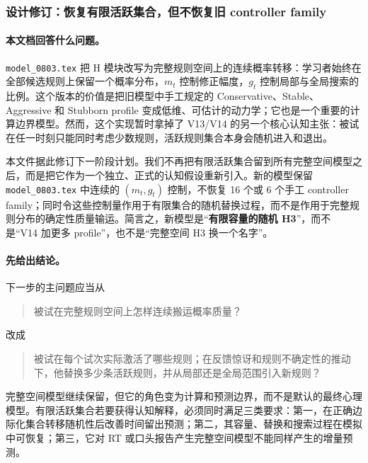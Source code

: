
\subsubsection{设计修订：恢复有限活跃集合，但不恢复旧 controller family}

\paragraph{本文档回答什么问题。}
\texttt{model\_0803.tex} 把 H 模块改写为完整规则空间上的连续概率转移：学习者始终在全部候选规则上保留一个概率分布，$m_t$ 控制修正幅度，$g_t$ 控制局部与全局搜索的比例。这个版本的价值是把旧模型中手工规定的 Conservative、Stable、Aggressive 和 Stubborn profile 变成低维、可估计的动力学；它也是一个重要的计算边界模型。然而，这个实现暂时拿掉了 V13/V14 的另一个核心认知主张：被试在任一时刻只能同时考虑少数规则，活跃规则集合本身会随机进入和退出。

本文件据此修订下一阶段计划。我们不再把有限活跃集合留到所有完整空间模型之后，而是把它作为一个独立、正式的认知假设重新引入。新的模型保留 \texttt{model\_0803.tex} 中连续的 $(m_t,g_t)$ 控制，不恢复 16 个或 6 个手工 controller family；同时令这些控制量作用于有限集合的随机替换过程，而不是作用于完整规则分布的确定性质量输运。简言之，新模型是“\textbf{有限容量的随机 H3}”，而不是“V14 加更多 profile”，也不是“完整空间 H3 换一个名字”。

\paragraph{先给出结论。}
下一步的主问题应当从
\begin{quote}
被试在完整规则空间上怎样连续搬运概率质量？
\end{quote}
改成
\begin{quote}
被试在每个试次实际激活了哪些规则；在反馈惊讶和规则不确定性的推动下，他替换多少条活跃规则，并从局部还是全局范围引入新规则？
\end{quote}
完整空间模型继续保留，但它的角色变为计算和预测边界，而不是默认的最终心理模型。有限活跃集合若要获得认知解释，必须同时满足三类要求：第一，在正确边际化集合转移随机性后改善时间留出预测；第二，其容量、替换和搜索过程在模拟中可恢复；第三，它对 RT 或口头报告产生完整空间模型不能同样产生的增量预测。

